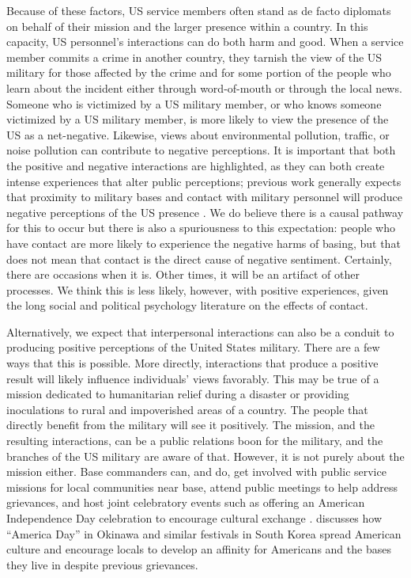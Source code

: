 {	Because of these factors, US service members often stand as de facto diplomats on behalf of their mission and the larger presence within a country. In this capacity, US personnel's interactions can do both harm and good. When a service member commits a crime in another country, they tarnish the view of the US military for those affected by the crime and for some portion of the people who learn about the incident either through word-of-mouth or through the local news. Someone who is victimized by a US military member, or who knows someone victimized by a US military member, is more likely to view the presence of the US as a net-negative. Likewise, views about environmental pollution, traffic, or noise pollution can contribute to negative perceptions. It is important that both the positive and negative interactions are highlighted, as they can both create intense experiences that alter public perceptions; previous work generally expects that proximity to military bases and contact with military personnel will produce negative perceptions of the US presence \cite{calder2007}. We do believe there is a causal pathway for this to occur but there is also a spuriousness to this expectation: people who have contact are more likely to experience the negative harms of basing, but that does not mean that contact is the direct cause of negative sentiment. Certainly, there are occasions when it is. Other times, it will be an artifact of other processes. We think this is less likely, however, with positive experiences, given the long social and political psychology literature on the effects of contact. 
	
	Alternatively, we expect that interpersonal interactions can also be a conduit to producing positive perceptions of the United States military. There are a few ways that this is possible. More directly, interactions that produce a positive result will likely influence individuals' views favorably. This may be true of a mission dedicated to humanitarian relief during a disaster or providing inoculations to rural and impoverished areas of a country. The people that directly benefit from the military will see it positively. The mission, and the resulting interactions, can be a public relations boon for the military, and the branches of the US military are aware of that. However, it is not purely about the mission either. Base commanders can, and do, get involved with public service missions for local communities near base, attend public meetings to help address grievances, and host joint celebratory events such as offering an American Independence Day celebration to encourage cultural exchange \cite{rafthree20190719}.  discusses how ``America Day'' in Okinawa and similar festivals in South Korea spread American culture and encourage locals to develop an affinity for Americans and the bases they live in despite previous grievances. 
	
}
